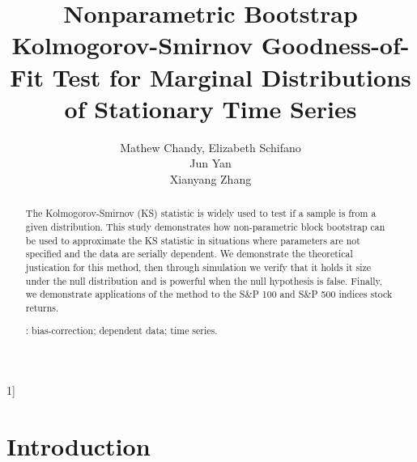 \documentclass[12pt, titlepage, letterpaper]{article}
\newcommand{\blind}{1]}
\begin{document}

\title{\bf Nonparametric Bootstrap Kolmogorov-Smirnov Goodness-of-Fit Test for
  Marginal Distributions of Stationary Time Series}
\blind
{
  \author{Mathew Chandy, %
  Elizabeth Schifano\\
  Jun Yan\\
  Xianyang Zhang\\
} \fi


\maketitle


\begin{abstract}

The Kolmogorov-Smirnov (KS) statistic is widely used to test if a sample is
from a given distribution. This study demonstrates how non-parametric 
block bootstrap can be 
used to approximate the KS statistic in situations where parameters are 
not specified and the data are serially dependent. We demonstrate the 
theoretical justication for this method, then through simulation we verify that
it holds it size under the null distribution and is powerful when the null 
hypothesis is false. Finally, we demonstrate applications of the method to
the S\&P 100 and S\&P 500 indices stock returns.

\bigskip
{}:
bias-correction; 
dependent data; 
time series. 
\end{abstract}

\doublespace 


\section{Introduction}
\label{sec:intro}

}
\end{document}

